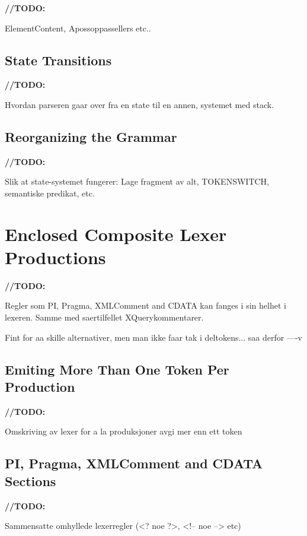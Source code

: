 \textbf{\LARGE //TODO:} 

ElementContent, Apossoppassellers etc..



\subsection{State Transitions}


\textbf{\LARGE //TODO:} 

Hvordan parseren gaar over fra en state til en annen, systemet med stack.

\subsection{Reorganizing the Grammar}
\label{sect:rewriteGrammar:reorganizing}
\textbf{\LARGE //TODO:} 

Slik at state-systemet fungerer: Lage fragment av alt, TOKENSWITCH, semantiske predikat, etc.


\section{Enclosed Composite Lexer Productions}
\label{sect:rewriteGrammar:enclosedComposite}
\textbf{\LARGE //TODO:} 

Regler som PI, Pragma, XMLComment and CDATA kan fanges i sin helhet i lexeren. Samme med saertilfellet XQuerykommentarer. 

Fint for aa skille alternativer, men man ikke faar tak i deltokens... saa derfor ----v

\subsection{Emiting More Than One Token Per Production}
\textbf{\LARGE //TODO:} 

Omskriving av lexer for a la produksjoner avgi mer enn ett token

\subsection{PI, Pragma, XMLComment and CDATA Sections}
\textbf{\LARGE //TODO:} 

Sammensatte omhyllede lexerregler (<? noe ?>, <!-- noe --> etc)

